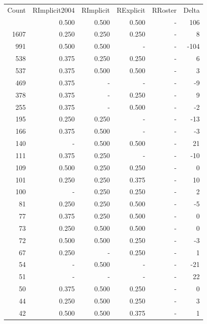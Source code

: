 \documentclass[a4paper]{article}\usepackage[]{graphicx}\usepackage[]{color}
\begin{document}
\begin{table}[ht]
\centering
\begin{tabular}{rrrrrr}
  \hline
Count & RImplicit2004 & RImplicit & RExplicit & RRoster & Delta \\ 
  \rowcolor{goodColor}  \hline
4512 & 0.500 & 0.500 & 0.500 & - & 106 \\ 
   \rowcolor{goodColor} 1607 & 0.250 & 0.250 & 0.250 & - & 8 \\ 
  991 & 0.500 & 0.500 & - & - & -104 \\ 
   \rowcolor{goodColor} 538 & 0.375 & 0.250 & 0.250 & - & 6 \\ 
   \rowcolor{goodColor} 537 & 0.375 & 0.500 & 0.500 & - & 3 \\ 
   \rowcolor{nullColor} 469 & 0.375 & - & - & - & -9 \\ 
   \rowcolor{sosoColor} 378 & 0.375 & - & 0.250 & - & 9 \\ 
   \rowcolor{sosoColor} 255 & 0.375 & - & 0.500 & - & -2 \\ 
  195 & 0.250 & 0.250 & - & - & -13 \\ 
  166 & 0.375 & 0.500 & - & - & -3 \\ 
   \rowcolor{goodColor} 140 & - & 0.500 & 0.500 & - & 21 \\ 
  111 & 0.375 & 0.250 & - & - & -10 \\ 
   \rowcolor{goodColor} 109 & 0.500 & 0.250 & 0.250 & - & 0 \\ 
  101 & 0.250 & 0.250 & 0.375 & - & 10 \\ 
   \rowcolor{goodColor} 100 & - & 0.250 & 0.250 & - & 2 \\ 
   \rowcolor{badColor} 81 & 0.250 & 0.250 & 0.500 & - & -5 \\ 
   \rowcolor{badColor} 77 & 0.375 & 0.250 & 0.500 & - & 0 \\ 
   \rowcolor{goodColor} 73 & 0.250 & 0.500 & 0.500 & - & 0 \\ 
   \rowcolor{badColor} 72 & 0.500 & 0.500 & 0.250 & - & -3 \\ 
   \rowcolor{sosoColor} 67 & 0.250 & - & 0.250 & - & 1 \\ 
  54 & - & 0.500 & - & - & -21 \\ 
   \rowcolor{nullColor} 51 & - & - & - & - & 22 \\ 
   \rowcolor{badColor} 50 & 0.375 & 0.500 & 0.250 & - & 0 \\ 
   \rowcolor{badColor} 44 & 0.250 & 0.500 & 0.250 & - & 3 \\ 
  42 & 0.500 & 0.500 & 0.375 & - & 1 \\ 

\end{tabular}
\end{table}
\end{document}
